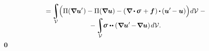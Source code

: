 \begin{otherlanguage}{russian}
\nopagebreak\vspace{-0.4em}\begin{multline*}
= \hspace{-0.2ex}
\integral\displaylimits_{\mathcal{V}} \hspace{-0.64ex}
\left(^{\mathstrut} \hspace{-0.1ex}
\Pi(\boldnabla \bm{u}'\hspace{.1ex}) - \Pi(\boldnabla \bm{u}) -
( \hspace{.12ex} \hspace{.4ex} \tikzmark{beginBalanceIsZero} \hspace{-0.4ex} \boldnabla \hspace{-0.1ex} \dotp \hspace{-0.1ex} \linearstress \hspace{.15ex} + \bm{f} \hspace{-0.25ex} \tikzmark{endBalanceIsZero} \hspace{.25ex} \hspace{.12ex} ) \hspace{-0.1ex} \dotp \hspace{-0.1ex} ( \bm{u}' \hspace{-0.2ex} - \bm{u} ) \right) \hspace{-0.32ex} d\mathcal{V}
\hspace{.6ex} -
\\[-1.2em]
- \integral\displaylimits_{\mathcal{V}} \hspace{-0.64ex} \linearstress \dotdotp ( \hspace{.1ex} \boldnabla \bm{u}' \hspace{-0.2ex} - \hspace{-0.32ex} \boldnabla \bm{u} ) \hspace{.25ex} d\mathcal{V} .
\end{multline*}
%
%
{${\scriptstyle \bm{0}}$}


\end{otherlanguage}
